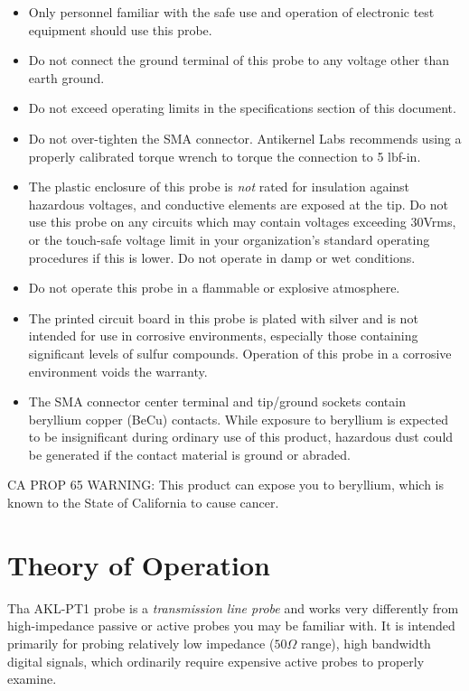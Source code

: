 \documentclass[11pt]{article}
\begin{document}
\begin{itemize}
\item Only personnel familiar with the safe use and operation of electronic test equipment should use this probe.
\item Do not connect the ground terminal of this probe to any voltage other than earth ground.
\item Do not exceed operating limits in the specifications section of this document.
\item Do not over-tighten the SMA connector. Antikernel Labs recommends using a properly calibrated torque wrench to
torque the connection to 5 lbf-in.
\item The plastic enclosure of this probe is \emph{not} rated for insulation against hazardous voltages, and conductive
elements are exposed at the tip. Do not use this probe on any circuits which may contain voltages exceeding 30Vrms, or
the touch-safe voltage limit in your organization's standard operating procedures if this is lower. Do not operate in
damp or wet conditions.
\item Do not operate this probe in a flammable or explosive atmosphere.
\item The printed circuit board in this probe is plated with silver and is not intended for use in corrosive environments,
especially those containing significant levels of sulfur compounds. Operation of this probe in a corrosive environment
voids the warranty.
\item  The SMA connector center terminal and tip/ground sockets contain beryllium copper (BeCu) contacts. While exposure to
beryllium is expected to be insignificant during ordinary use of this product, hazardous dust could be generated if the
contact material is ground or abraded.
\end{itemize}

CA PROP 65 WARNING: This product can expose you to beryllium, which is known to the State of California to cause cancer.

\pagebreak
\section{Theory of Operation}

Tha AKL-PT1 probe is a \emph{transmission line probe} and works very differently from high-impedance passive or active
probes you may be familiar with. It is intended primarily for probing relatively low impedance ($50 \Omega$ range),
high bandwidth digital signals, which ordinarily require expensive active probes to properly examine.
\end{document}
